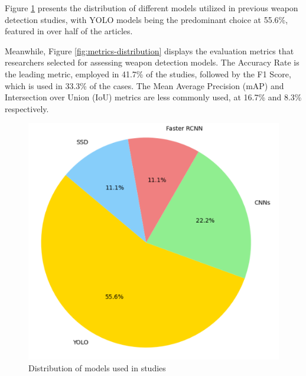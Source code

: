 Figure \ref{fig:models-distribution} presents the distribution of different models utilized in previous weapon detection studies, with YOLO models being the predominant choice at 55.6\%, featured in over half of the articles. 

Meanwhile, Figure \ref{fig:metrics-distribution} displays the evaluation metrics that researchers selected for assessing weapon detection models. The Accuracy Rate is the leading metric, employed in 41.7\% of the studies, followed by the F1 Score, which is used in 33.3\% of the cases. The Mean Average Precision (mAP) and Intersection over Union (IoU) metrics are less commonly used, at 16.7\% and 8.3\% respectively.
\begin{figure}[h]
    \centering

    \begin{minipage}{0.4\textwidth}
        \centering
        \includegraphics[width=\textwidth]{figs/models-distribution.png} %
        \caption{Distribution of models used in studies}
        \label{fig:models-distribution}
    \end{minipage}
    \hfill
    \begin{minipage}{0.5\textwidth}
        \centering

\end{minipage}
\end{figure}
